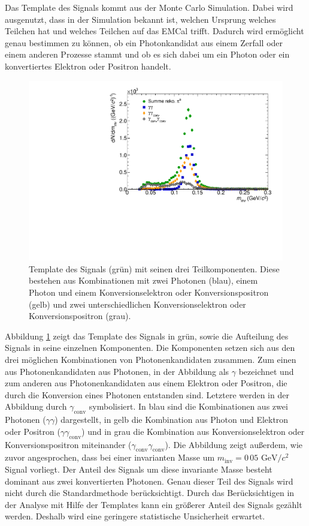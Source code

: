 Das Template des Signals kommt aus der Monte Carlo Simulation.
Dabei wird ausgenutzt, dass in der Simulation bekannt ist, welchen Ursprung welches Teilchen hat und welches Teilchen auf das EMCal trifft.
Dadurch wird ermöglicht genau bestimmen zu können, ob ein Photonkandidat aus einem Zerfall oder einem anderen Prozesse stammt und ob es sich dabei um ein Photon oder ein konvertiertes Elektron oder Positron handelt.
\begin{figure}[tp]
\centering
\includegraphics[width=.75\linewidth]{PeakTemplateMotivation10_Data_2016.pdf}
\caption{Template des Signals (grün) mit seinen drei Teilkomponenten.
Diese bestehen aus Kombinationen mit zwei Photonen (blau), einem Photon und einem Konversionselektron oder Konversionspositron (gelb) und zwei unterschiedlichen Konversionselektron oder Konversionspositron (grau).}
\label{fig:SigTemp}
\end{figure}
\newline
Abbildung \ref{fig:SigTemp} zeigt das Template des Signals in grün, sowie die Aufteilung des Signals in seine einzelnen Komponenten.
Die Komponenten setzen sich aus den drei möglichen Kombinationen von Photonenkandidaten zusammen.
Zum einen aus Photonenkandidaten aus Photonen, in der Abbildung als $\gamma$ bezeichnet und zum anderen aus Photonenkandidaten aus einem Elektron oder Positron, die durch die Konversion  eines Photonen entstanden sind.
Letztere werden in der Abbildung durch $\gamma_\text{conv}$ symbolisiert.
\newline
In blau sind die Kombinationen aus zwei Photonen ($\gamma\gamma$) dargestellt, in gelb die Kombination aus Photon und Elektron oder Positron ($\gamma\gamma_\text{conv}$) und in grau die Kombination aus Konversionselektron oder Konversionspositron miteinander ($\gamma_\text{conv}\gamma_\text{conv}$).
\newline
Die Abbildung zeigt außerdem, wie zuvor angesprochen, dass bei einer invarianten Masse um $m_\text{inv}=0\,05 \text{ GeV}/c^{2}$ Signal vorliegt.
Der Anteil des Signals um diese invariante Masse besteht dominant aus zwei konvertierten Photonen.
Genau dieser Teil des Signals wird nicht durch die Standardmethode berücksichtigt.
Durch das Berücksichtigen in der Analyse mit Hilfe der Templates kann ein größerer Anteil des Signals gezählt werden.
Deshalb wird eine geringere statistische Unsicherheit erwartet.